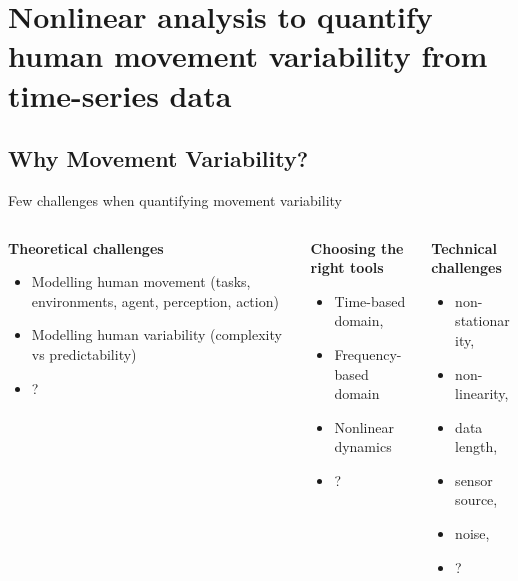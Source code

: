 \section{Nonlinear analysis to quantify human movement variability from time-series data}
\subsection{Why Movement Variability?}


{
\begin{frame}[fragile]{Few challenges when quantifying movement variability}
  \begin{columns}
   

 \begin{column}{.3\linewidth}
    
	\textbf{Theoretical challenges}
  \begin{itemize}
        \item Modelling human movement (tasks, environments, agent, perception, action)
        \item Modelling human variability (complexity vs predictability)
        \item ?
      \end{itemize}
    \end{column}

   \begin{column}{.3\linewidth}
	
	\textbf{Choosing the right tools} 
           \begin{itemize}
                \item Time-based domain,
		\item Frequency-based domain
		\item Nonlinear dynamics
                \item ?
              \end{itemize}
	\end{column}

   \begin{column}{.3\linewidth}
	\textbf{Technical challenges}
           \begin{itemize}
                \item non-stationarity, 
		\item non-linearity, 
		\item data length, 
		\item sensor source, 
		\item noise,
                \item ?
              \end{itemize}
	\end{column}



  \end{columns}


\end{frame}
}



